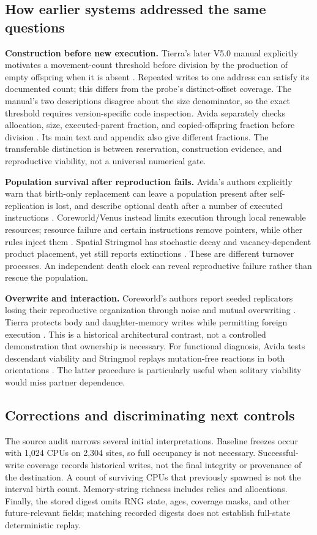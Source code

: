 \subsection{How earlier systems addressed the same questions}
\textbf{Construction before new execution.}
Tierra's later V5.0 manual explicitly motivates a movement-count threshold
before division by the production of empty offspring when it is absent
\citep{RayManual1998}. Repeated writes to one address can satisfy its documented
count; this differs from the probe's distinct-offset coverage. The manual's
two descriptions disagree about the size denominator, so the exact threshold
requires version-specific code inspection. Avida separately checks allocation,
size, executed-parent fraction, and copied-offspring fraction before division
\citep{OfriaWilke2004}. Its main text and appendix also give different fractions.
The transferable distinction is between reservation, construction evidence,
and reproductive viability, not a universal numerical gate.

\textbf{Population survival after reproduction fails.}
Avida's authors explicitly warn that birth-only replacement can leave a
population present after self-replication is lost, and describe optional
death after a number of executed instructions \citep{OfriaWilke2004}.
Coreworld/Venus instead limits execution through local renewable resources;
resource failure and certain instructions remove pointers, while other rules
inject them \citep{Rasmussen1991}. Spatial Stringmol has stochastic decay and
vacancy-dependent product placement, yet still reports extinctions
\citep{Hickinbotham2021}. These are different turnover processes. An independent
death clock can reveal reproductive failure rather than rescue the population.

\textbf{Overwrite and interaction.}
Coreworld's authors report seeded replicators losing their reproductive
organization through noise and mutual overwriting \citep{Rasmussen1991}.
Tierra protects body and daughter-memory writes while permitting foreign
execution \citep{Ray1991}. This is a historical architectural contrast, not a
controlled demonstration that ownership is necessary. For functional diagnosis,
Avida tests descendant viability and Stringmol replays mutation-free reactions
in both orientations \citep{OfriaWilke2004,Hickinbotham2021}. The latter procedure
is particularly useful when solitary viability would miss partner dependence.

\subsection{Corrections and discriminating next controls}
The source audit narrows several initial interpretations. Baseline freezes
occur with 1,024 CPUs on 2,304 sites, so full occupancy is not necessary.
Successful-write coverage records historical writes, not the final integrity
or provenance of the destination. A count of surviving CPUs that previously
spawned is not the interval birth count. Memory-string richness includes
relics and allocations. Finally, the stored digest omits RNG state, ages,
coverage masks, and other future-relevant fields; matching recorded digests
does not establish full-state deterministic replay.

